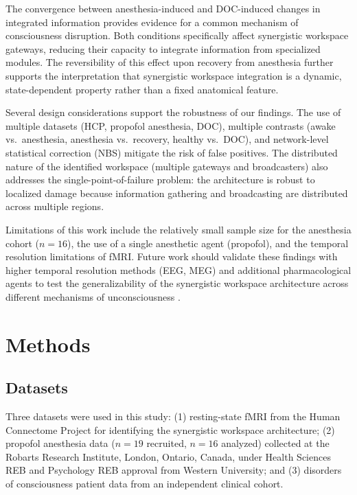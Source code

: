 \documentclass[11pt]{article}
\begin{document}
The convergence between anesthesia-induced and DOC-induced changes in integrated information provides evidence for a common mechanism of consciousness disruption. Both conditions specifically affect synergistic workspace gateways, reducing their capacity to integrate information from specialized modules. The reversibility of this effect upon recovery from anesthesia further supports the interpretation that synergistic workspace integration is a dynamic, state-dependent property rather than a fixed anatomical feature.

Several design considerations support the robustness of our findings. The use of multiple datasets (HCP, propofol anesthesia, DOC), multiple contrasts (awake vs.\ anesthesia, anesthesia vs.\ recovery, healthy vs.\ DOC), and network-level statistical correction (NBS) mitigate the risk of false positives. The distributed nature of the identified workspace (multiple gateways and broadcasters) also addresses the single-point-of-failure problem: the architecture is robust to localized damage because information gathering and broadcasting are distributed across multiple regions.

Limitations of this work include the relatively small sample size for the anesthesia cohort ($n = 16$), the use of a single anesthetic agent (propofol), and the temporal resolution limitations of fMRI. Future work should validate these findings with higher temporal resolution methods (EEG, MEG) and additional pharmacological agents to test the generalizability of the synergistic workspace architecture across different mechanisms of unconsciousness \citep{casali2013theoretically}.

\section{Methods}

\subsection{Datasets}

Three datasets were used in this study: (1) resting-state fMRI from the Human Connectome Project \citep{vanessen2013wuminn} for identifying the synergistic workspace architecture; (2) propofol anesthesia data ($n = 19$ recruited, $n = 16$ analyzed) collected at the Robarts Research Institute, London, Ontario, Canada, under Health Sciences REB and Psychology REB approval from Western University; and (3) disorders of consciousness patient data from an independent clinical cohort.
\end{document}
